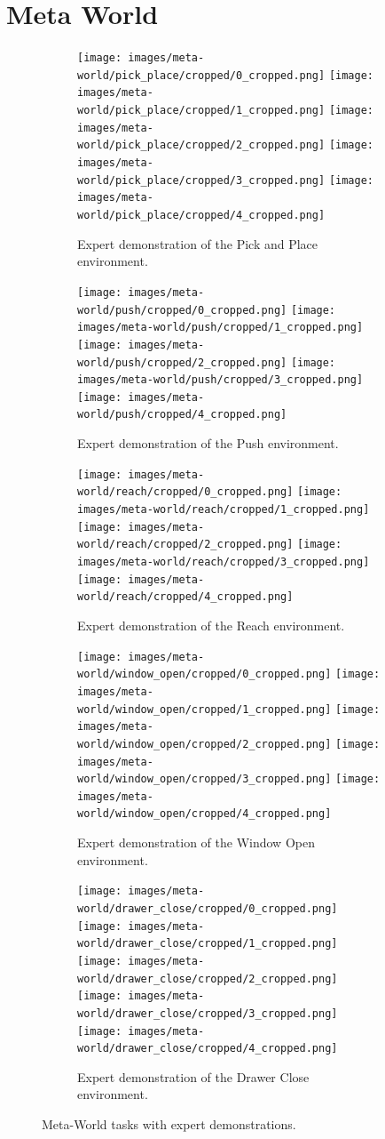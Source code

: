 \chapter{Meta World}
\label{chapter:MetaWorld}
\begin{figure}[h]
    \centering
    \begin{subfigure}[b]{1\linewidth}
    \texttt{[image: images/meta-world/pick\_place/cropped/0\_cropped.png]}
    \texttt{[image: images/meta-world/pick\_place/cropped/1\_cropped.png]}
    \texttt{[image: images/meta-world/pick\_place/cropped/2\_cropped.png]}
    \texttt{[image: images/meta-world/pick\_place/cropped/3\_cropped.png]}
    \texttt{[image: images/meta-world/pick\_place/cropped/4\_cropped.png]}
    \caption{Expert demonstration of the Pick and Place environment.}
    \end{subfigure}
    \begin{subfigure}[b]{1\linewidth}
        \texttt{[image: images/meta-world/push/cropped/0\_cropped.png]}
        \texttt{[image: images/meta-world/push/cropped/1\_cropped.png]}
        \texttt{[image: images/meta-world/push/cropped/2\_cropped.png]}
        \texttt{[image: images/meta-world/push/cropped/3\_cropped.png]}
        \texttt{[image: images/meta-world/push/cropped/4\_cropped.png]}
        \caption{Expert demonstration of the Push environment.}
    \end{subfigure}
    \begin{subfigure}[b]{1\linewidth}
        \texttt{[image: images/meta-world/reach/cropped/0\_cropped.png]}
        \texttt{[image: images/meta-world/reach/cropped/1\_cropped.png]}
        \texttt{[image: images/meta-world/reach/cropped/2\_cropped.png]}
        \texttt{[image: images/meta-world/reach/cropped/3\_cropped.png]}
        \texttt{[image: images/meta-world/reach/cropped/4\_cropped.png]}
        \caption{Expert demonstration of the Reach environment.}
    \end{subfigure}
    \begin{subfigure}[b]{1\linewidth}
        \texttt{[image: images/meta-world/window\_open/cropped/0\_cropped.png]}
        \texttt{[image: images/meta-world/window\_open/cropped/1\_cropped.png]}
        \texttt{[image: images/meta-world/window\_open/cropped/2\_cropped.png]}
        \texttt{[image: images/meta-world/window\_open/cropped/3\_cropped.png]}
        \texttt{[image: images/meta-world/window\_open/cropped/4\_cropped.png]}
        \caption{Expert demonstration of the Window Open environment.}
    \end{subfigure}
    \begin{subfigure}[b]{1\linewidth}
        \texttt{[image: images/meta-world/drawer\_close/cropped/0\_cropped.png]}
        \texttt{[image: images/meta-world/drawer\_close/cropped/1\_cropped.png]}
        \texttt{[image: images/meta-world/drawer\_close/cropped/2\_cropped.png]}
        \texttt{[image: images/meta-world/drawer\_close/cropped/3\_cropped.png]}
        \texttt{[image: images/meta-world/drawer\_close/cropped/4\_cropped.png]}
        \caption{Expert demonstration of the Drawer Close environment.}
    \end{subfigure}
    \caption{Meta-World tasks with expert demonstrations.}
    \label{fig:meta-world}
\end{figure}
